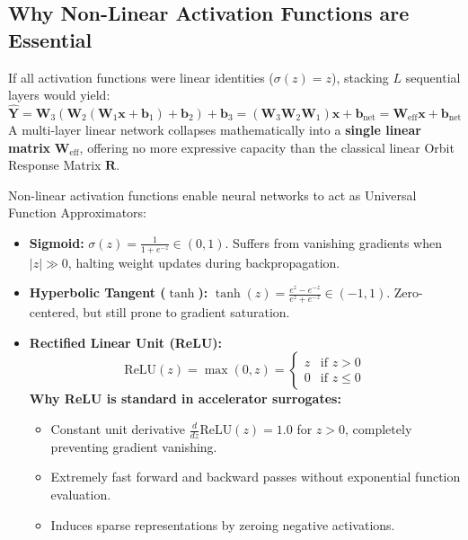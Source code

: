 \documentclass[11pt,a4paper]{article}
\begin{document}
\subsection{Why Non-Linear Activation Functions are Essential}
\begin{infobox}
If all activation functions were linear identities ($\sigma(z) = z$), stacking $L$ sequential layers would yield:
\begin{equation}
    \hat{\mathbf{Y}} = \mathbf{W}_3 (\mathbf{W}_2 (\mathbf{W}_1 \mathbf{x} + \mathbf{b}_1) + \mathbf{b}_2) + \mathbf{b}_3 = (\mathbf{W}_3 \mathbf{W}_2 \mathbf{W}_1) \mathbf{x} + \mathbf{b}_{\text{net}} = \mathbf{W}_{\text{eff}} \mathbf{x} + \mathbf{b}_{\text{net}}
\end{equation}
A multi-layer linear network collapses mathematically into a \textbf{single linear matrix} $\mathbf{W}_{\text{eff}}$, offering no more expressive capacity than the classical linear Orbit Response Matrix $\mathbf{R}$.
\end{infobox}

Non-linear activation functions enable neural networks to act as Universal Function Approximators:
\begin{itemize}
    \item \textbf{Sigmoid:} $\sigma(z) = \frac{1}{1 + e^{-z}} \in (0, 1)$. Suffers from vanishing gradients when $|z| \gg 0$, halting weight updates during backpropagation.
    \item \textbf{Hyperbolic Tangent ($\tanh$):} $\tanh(z) = \frac{e^z - e^{-z}}{e^z + e^{-z}} \in (-1, 1)$. Zero-centered, but still prone to gradient saturation.
    \item \textbf{Rectified Linear Unit (ReLU):}
    \begin{equation}
        \text{ReLU}(z) = \max(0, z) = \begin{cases} z & \text{if } z > 0 \\ 0 & \text{if } z \le 0 \end{cases}
    \end{equation}
    \textbf{Why ReLU is standard in accelerator surrogates:}
    \begin{itemize}
        \item Constant unit derivative $\frac{d}{dz}\text{ReLU}(z) = 1.0$ for $z > 0$, completely preventing gradient vanishing.
        \item Extremely fast forward and backward passes without exponential function evaluation.
        \item Induces sparse representations by zeroing negative activations.
    \end{itemize}
\end{itemize}
\end{document}
